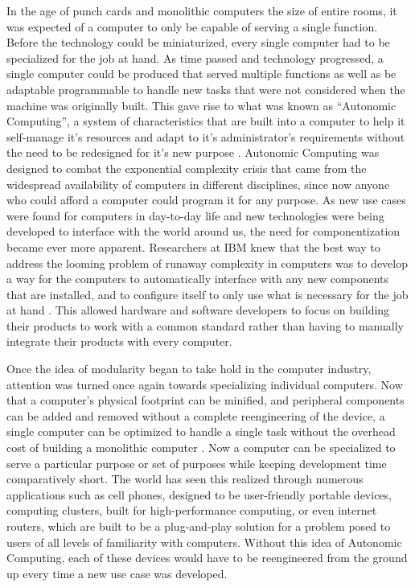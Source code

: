 In the age of punch cards and monolithic computers the size of entire rooms, it was expected of a computer to only be capable of serving a single function.
Before the technology could be miniaturized, every single computer had to be specialized for the job at hand.
As time passed and technology progressed, a single computer could be produced that served multiple functions as well as be adaptable programmable to handle new tasks that were not considered when the machine was originally built.
This gave rise to what was known as \enquote{Autonomic Computing}, a system of characteristics that are built into a computer to help it self-manage it's resources and adapt to it's administrator's requirements without the need to be redesigned for it's new purpose \citep{AutonomicComputing}.
Autonomic Computing was designed to combat the exponential complexity crisis that came from the widespread availability of computers in different disciplines, since now anyone who could afford a computer could program it for any purpose.
As new use cases were found for computers in day-to-day life and new technologies were being developed to interface with the world around us, the need for componentization became ever more apparent.
Researchers at IBM knew that the best way to address the looming problem of runaway complexity in computers was to develop a way for the computers to automatically interface with any new components that are installed, and to configure itself to only use what is necessary for the job at hand \citep[p.~43]{AutonomicComputing}.
This allowed hardware and software developers to focus on building their products to work with a common standard rather than having to manually integrate their products with every computer.

Once the idea of modularity began to take hold in the computer industry, attention was turned once again towards specializing individual computers.
Now that a computer's physical footprint can be minified, and peripheral components can be added and removed without a complete reengineering of the device, a single computer can be optimized to handle a single task without the overhead cost of building a monolithic computer \citep{Burbeck2007ComplexityAT}.
Now a computer can be specialized to serve a particular purpose or set of purposes while keeping development time comparatively short.
The world has seen this realized through numerous applications such as cell phones, designed to be user-friendly portable devices, computing clusters, built for high-performance computing, or even internet routers, which are built to be a plug-and-play solution for a problem posed to users of all levels of familiarity with computers.
Without this idea of Autonomic Computing, each of these devices would have to be reengineered from the ground up every time a new use case was developed.

